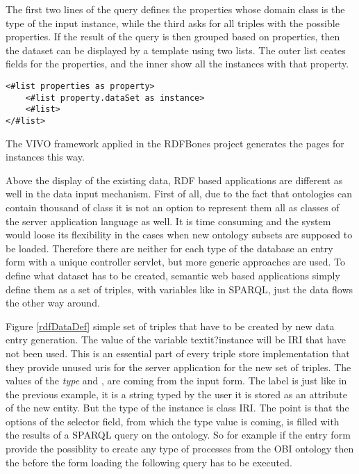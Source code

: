 The first two lines of the query defines the properties whose domain class is the type of the input instance, while the third asks for all triples with the possible properties. If the result of the query is then grouped based on properties, then the dataset can be displayed by a template using two lists. The outer list ceates fields for the properties, and the inner show all the instances with that property.


\begin{lstlisting}[captionpos=b, caption=Ontology adaptive template file, label=template,
basicstyle=\footnotesize,frame=single]
<#list properties as property>
	<#list property.dataSet as instance> 
	<#list> 
</#list>
\end{lstlisting}

The VIVO framework applied in the RDFBones project generates the pages for instances this way.


Above the display of the existing data, RDF based applications are different as well in the data input mechanism. First of all, due to the fact that ontologies can contain thousand of class it is not an option to represent them all as classes of the server application language as well. It is time consuming and the system would loose its flexibility in the cases when new ontology subsets are supposed to be loaded. Therefore there are neither for each type of the database an entry form with a unique controller servlet, but more generic approaches are used.
To define what dataset has to be created, semantic web based applications simply define them as a set of triples, with variables like in SPARQL, just the data flows the other way around.


Figure \ref{rdfDataDef} simple set of triples that have to be created by new data entry generation. The value of the variable textit{?instance} will be IRI that have not been used. This is an essential part of every triple store implementation that they provide unused uris for the server application for the new set of triples. The values of the \textit{type} and , 
are coming from the input form. The label is just like in the previous example, it is a string typed by the user it is stored as an attribute of the new entity. But the type of the instance is class IRI. The point is that the options of the selector field, from which the type value is coming, is filled with the results of a SPARQL query on the ontology. So for example if the entry form provide the possiblity to create any type of processes from the OBI ontology then the before the form loading the following query has to be executed.

